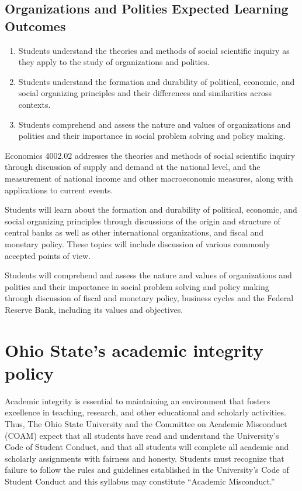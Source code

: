 \documentclass[12pt]{article}
\begin{document}
\subsection*{Organizations and Polities Expected Learning Outcomes}
\begin{enumerate}
    \item Students understand the theories and methods of social scientific inquiry as they apply to the study of organizations and polities.
    \item Students understand the formation and durability of political, economic, and social organizing principles and their differences and similarities across contexts.
    \item Students comprehend and assess the nature and values of organizations and polities and their importance in social problem solving and policy making.
\end{enumerate}

Economics 4002.02 addresses the theories and methods of social scientific inquiry through discussion of supply and demand at the national level, and the measurement of national income and other macroeconomic measures, along with applications to current events.

Students will learn about the formation and durability of political, economic, and social organizing principles through discussions of the origin and structure of central banks as well as other international organizations, and fiscal and monetary policy. These topics will include discussion of various commonly accepted points of view.

Students will comprehend and assess the nature and values of organizations and polities and their importance in social problem solving and policy making through discussion of fiscal and monetary policy, business cycles and the Federal Reserve Bank, including its values and objectives.



\newpage

\section*{Ohio State’s academic integrity policy}

Academic integrity is essential to maintaining an environment that fosters excellence in teaching, research, and other educational and scholarly activities.
Thus, The Ohio State University and the Committee on Academic Misconduct (COAM) expect that all students have read and understand the University’s Code of Student Conduct, and that all students will complete all academic and scholarly assignments with fairness and honesty.
Students must recognize that failure to follow the rules and guidelines established in the University’s Code of Student Conduct and this syllabus may constitute ``Academic Misconduct.''
\end{document}
